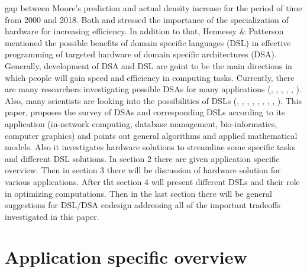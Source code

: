 \documentclass[conference]{IEEEtran}
\begin{document}
gap between Moore's prediction and actual density increase for the period of time from 2000 and 2018. Both \cite{ref20} and \cite{ref21} stressed the importance of the specialization of hardware for increasing efficiency. In addition to that, Hennessy \& Patterson \cite{ref21} mentioned the possible benefits of domain specific languages (DSL) in effective programming of targeted hardware of domain specific architectures (DSA). Generally, development of DSA and DSL are goint to be the main directions in which people will gain speed and efficiency in computing tasks. Currently, there are many researchers investigating possible DSAs for many applications (\cite{ref1}, \cite{ref2}, \cite{ref8}, \cite{ref9}, \cite{ref10}, \cite{ref11}). Also, many scientists are looking into the possibilities of DSLs (\cite{ref3}, \cite{ref4}, \cite{ref5}, \cite{ref6}, \cite{ref7}, \cite{ref9}, \cite{ref12}, \cite{ref13}, \cite{ref14}). This paper, proposes the survey of DSAs and corresponding DSLs according to its application (in-network computing, database management, bio-informatics, computer graphics) and points out general algorithms and applied mathematical models. Also it investigates hardware solutions to streamline some specific tasks and different DSL solutions. In section 2 there are given application specific overview. Then in section 3 there will be discussion of hardware solution for various applications. After tht section 4 will present different DSLs and their role in optimizing computations. Then in the last section there will be general suggestions for DSL/DSA codesign addressing all of the important tradeoffs investigated in this paper.  

\section{Application specific overview}
\end{document}
